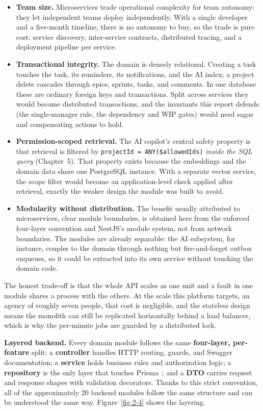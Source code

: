\begin{itemize}
  \item \textbf{Team size.} Microservices trade operational complexity for team autonomy: they
    let independent teams deploy independently. With a single developer and a five-month
    timeline, there is no autonomy to buy, so the trade is pure cost: service discovery,
    inter-service contracts, distributed tracing, and a deployment pipeline per service.
  \item \textbf{Transactional integrity.} The domain is densely relational. Creating a task
    touches the task, its reminders, its notifications, and the AI index; a project delete
    cascades through epics, sprints, tasks, and comments. In one database these are ordinary
    foreign keys and transactions. Split across services they would become distributed
    transactions, and the invariants this report defends (the single-manager rule, the
    dependency and WIP gates) would need sagas and compensating actions to hold.
  \item \textbf{Permission-scoped retrieval.} The AI copilot's central safety property is that
    retrieval is filtered by \texttt{projectId = ANY(\$allowedIds)} \emph{inside the SQL query}
    (Chapter~5). That property exists because the embeddings and the domain data share one
    PostgreSQL instance. With a separate vector service, the scope filter would become an
    application-level check applied after retrieval, exactly the weaker design the module was
    built to avoid.
  \item \textbf{Modularity without distribution.} The benefit usually attributed to microservices,
    clear module boundaries, is obtained here from the enforced four-layer convention and
    NestJS's module system, not from network boundaries. The modules are already separable: the
    AI subsystem, for instance, couples to the domain through nothing but fire-and-forget outbox
    enqueues, so it could be extracted into its own service without touching the domain code.
\end{itemize}

The honest trade-off is that the whole API scales as one unit and a fault in one module shares a
process with the others. At the scale this platform targets, an agency of roughly seven
people, that cost is negligible, and the stateless design means the monolith can still be
replicated horizontally behind a load balancer, which is why the per-minute jobs are guarded by a
distributed lock.

\textbf{Layered backend.} Every domain module follows the same \textbf{four-layer, per-feature}
split: a \textbf{controller} handles HTTP routing, guards, and Swagger~\cite{swagger}
documentation; a \textbf{service} holds business rules and authorization logic; a
\textbf{repository} is the only layer that touches Prisma~\cite{prisma}; and a \textbf{DTO}
carries request and response shapes with validation decorators. Thanks to this strict
convention, all of the approximately 20 backend modules follow the same structure and can be
understood the same way. Figure~\ref{fig:2-4} shows the layering.


